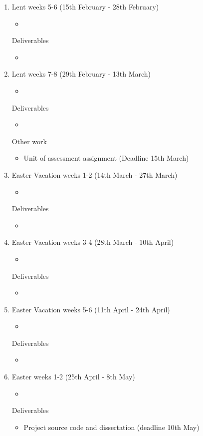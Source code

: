 \documentclass[12pt,a4paper]{article}
\begin{document}
\begin{enumerate}
    \item Lent weeks 5-6 (15th February - 28th February)
    \begin{itemize}
        \item 
    \end{itemize}
    Deliverables
    \begin{itemize}
        \item 
    \end{itemize}

    \item Lent weeks 7-8 (29th February - 13th March)
    \begin{itemize}
        \item 
    \end{itemize}
    Deliverables
    \begin{itemize}
        \item 
    \end{itemize}
    Other work
    \begin{itemize}
        \item Unit of assessment assignment (Deadline 15th March)
    \end{itemize}

    \item Easter Vacation weeks 1-2 (14th March - 27th March)
    \begin{itemize}
        \item 
    \end{itemize}
    Deliverables
    \begin{itemize}
        \item 
    \end{itemize}

    \item Easter Vacation weeks 3-4 (28th March - 10th April)
    \begin{itemize}
        \item 
    \end{itemize}
    Deliverables
    \begin{itemize}
        \item 
    \end{itemize}

    \item Easter Vacation weeks 5-6 (11th April - 24th April)
    \begin{itemize}
        \item 
    \end{itemize}
    Deliverables
    \begin{itemize}
        \item 
    \end{itemize}

    \item Easter weeks 1-2 (25th April - 8th May)
    \begin{itemize}
        \item 
    \end{itemize}
    Deliverables
    \begin{itemize}
        \item Project source code and dissertation (deadline 10th May)
    \end{itemize}

\end{enumerate}
\end{document}
